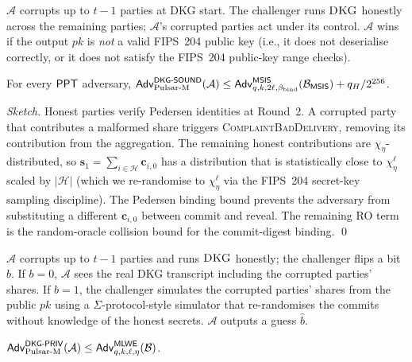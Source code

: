 \begin{game}
\label{game:dkg-sound}
$\mathcal{A}$ corrupts up to $t-1$ parties at DKG start. The
challenger runs $\textsc{DKG}$ honestly across the remaining parties;
$\mathcal{A}$'s corrupted parties act under its control.
$\mathcal{A}$ wins if the output $\mathit{pk}$ is \emph{not} a valid
FIPS~204 public key (i.e., it does not deserialise correctly, or it
does not satisfy the FIPS~204 public-key range checks).
\end{game}

\begin{theorem}
\label{thm:dkg-sound}
For every $\mathsf{PPT}$ adversary,
$\mathsf{Adv}^{\mathsf{DKG\textsf{-}SOUND}}_{\mathrm{Pulsar\text{-}M}}(\mathcal{A}) \le \mathsf{Adv}^{\mathsf{MSIS}}_{q, k, 2\ell, \beta_{\mathrm{bind}}}(\mathcal{B}_{\mathsf{MSIS}}) + q_H / 2^{256}$.
\end{theorem}

\begin{proof}[Sketch]
Honest parties verify Pedersen identities at Round~2. A corrupted
party that contributes a malformed share triggers
\textsc{ComplaintBadDelivery}, removing its contribution from the
aggregation. The remaining honest contributions are
$\chi_\eta$-distributed, so $\mathbf{s}_1 = \sum_{i \in \mathcal{H}}
\mathbf{c}_{i,0}$ has a distribution that is statistically close to
$\chi_\eta^\ell$ scaled by $|\mathcal{H}|$ (which we re-randomise to
$\chi_\eta^\ell$ via the FIPS~204 secret-key sampling discipline).
The Pedersen binding bound prevents the adversary from substituting a
different $\mathbf{c}_{i,0}$ between commit and reveal. The remaining
RO term is the random-oracle collision bound for the commit-digest
binding. \qed
\end{proof}

\begin{game}
\label{game:dkg-priv}
$\mathcal{A}$ corrupts up to $t-1$ parties and runs $\textsc{DKG}$ honestly;
the challenger flips a bit $b$. If $b = 0$, $\mathcal{A}$ sees the
real DKG transcript including the corrupted parties' shares. If
$b = 1$, the challenger simulates the corrupted parties' shares from
the public $\mathit{pk}$ using a $\Sigma$-protocol-style simulator
that re-randomises the commits without knowledge of the honest
secrets. $\mathcal{A}$ outputs a guess $\hat b$.
\end{game}

\begin{theorem}
\label{thm:dkg-priv}
$\mathsf{Adv}^{\mathsf{DKG\textsf{-}PRIV}}_{\mathrm{Pulsar\text{-}M}}(\mathcal{A}) \le \mathsf{Adv}^{\mathsf{MLWE}}_{q, k, \ell, \eta}(\mathcal{B})$.
\end{theorem}

